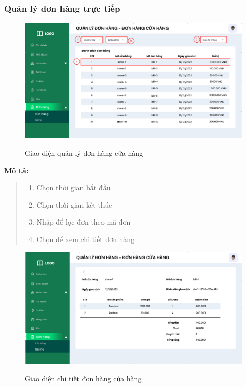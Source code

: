     \newpage
    
    \subsubsection{Quản lý đơn hàng trực tiếp}
    \begin{figure}[!htp]
        \centering
        \includegraphics[width=12cm]{img/UI/admin/OfflineOrder.png}
        \label{42}
        \newline
        \caption{Giao diện quản lý đơn hàng cửa hàng}
    \end{figure}
    \textbf{Mô tả:}  
    \begin{quote}
        \begin{enumerate}
            \item Chọn thời gian bắt đầu
            \item Chọn thời gian kết thúc
            \item Nhập để lọc đơn theo mã đơn
            \item Chọn để xem chi tiết đơn hàng
        \end{enumerate}
    \end{quote}
        \begin{figure}[!htp]
            \centering
            \includegraphics[width=12cm]{img/UI/admin/OfflineOrder_detai;.png}
            \label{43}
            \newline
            \caption{Giao diện chi tiết đơn hàng cửa hàng}
        \end{figure}



